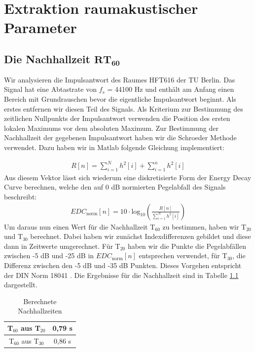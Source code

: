 \chapter{Extraktion raumakustischer Parameter}
\section{Die Nachhallzeit $\mathbf{RT_{60}}$}
\label{sec:rt60}
Wir analysieren die Impulsantwort des Raumes HFT616 der TU Berlin.
Das Signal hat eine Abtastrate von $f_s$ = 44100 Hz und enthält am Anfang einen Bereich mit Grundrauschen bevor die eigentliche Impulsantwort beginnt.
Als erstes entfernen wir diesen Teil des Signals.
Als Kriterium zur Bestimmung des zeitlichen Nullpunkts der Impulsantwort verwenden die Position des ersten lokalen Maximums vor dem absoluten Maximum.
Zur Bestimmung der Nachhallzeit der gegebenen Impulsantwort haben wir die Schroeder Methode \cite{Schroeder65} verwendet.
Dazu haben wir in Matlab folgende Gleichung implementiert:

\begin{align*}
R[n] = \sum_{i=1}^N h^2[i] + \sum_{i=1}^n h^2[i]
\end{align*}
Aus diesem Vektor lässt sich wiederum eine diskretisierte Form der Energy Decay Curve berechnen, welche den auf 0 dB normierten Pegelabfall des Signals  beschreibt:
\begin{align*}
EDC_{\mathrm{norm}}[n] = 10 \cdot \mathrm{log}_{10} \left(\frac{R[n]}{\sum_{i=1}^N h^2[i]}\right)
\end{align*}
Um daraus nun einen Wert für die Nachhallzeit T$_{60}$ zu bestimmen, haben wir T$_{20}$ und T$_{30}$ berechnet.
Dabei haben wir zunächst Indexdifferenzen gebildet und diese dann in Zeitwerte umgerechnet.
Für T$_{20}$ haben wir die Punkte die Pegelabfällen zwischen -5 dB und -25 dB in $EDC_{\mathrm{norm}}[n]$ entsprechen verwendet, für T$_{30}$, die Differenz zwischen den -5 dB und -35 dB Punkten.
Dieses Vorgehen entspricht der DIN Norm 18041 \cite{DIN_18041}.
Die Ergebnisse für die Nachhallzeit sind in Tabelle \ref{tab:T} dargestellt.

\begin{table}[H]
\centering
\caption{Berechnete Nachhallzeiten}
\label{tab:T}
\begin{tabular}{ | c | c |}
  \hline
  T$_{60}$ aus T$_{20}$ &  0,79 s \\
  \hline
  T$_{60}$ aus T$_{30}$ &  0,86 s \\
  \hline
  \end{tabular}
\end{table}


